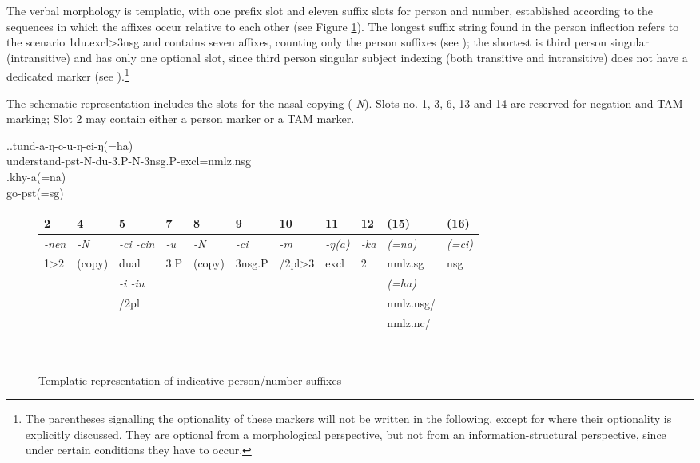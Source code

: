 The verbal morphology is  templatic, with one prefix slot and eleven suffix slots for person and number, established according to the sequences in which the affixes occur relative to each other (see Figure \ref{agr-list}). The longest suffix string found in the person inflection refers to the scenario {\sc 1du.excl>3nsg} and contains seven affixes,  counting only the person suffixes (see \Next[a]); the shortest is third person singular (intransitive) and has only one optional slot, since third person singular subject indexing (both transitive and intransitive) does not have a dedicated marker (see \Next[b]).\footnote{The parentheses signalling the optionality of these markers will not be written in the following, except for where their optionality is explicitly discussed. They are optional from a morphological perspective, but not from an information-structural perspective, since under certain conditions they have to occur.}

The schematic representation includes the slots for the nasal copying (\emph{-N}). Slots no. 1, 3, 6,  13 and 14 are reserved for negation and TAM-marking; Slot 2 may contain either a person marker or a TAM marker. 

\ex.\ag.tund-a-ŋ-c-u-ŋ-ci-ŋ(=ha)\\
understand{\sc -pst-N-du-3.P-N-3nsg.P-excl=nmlz.nsg}\\
\bg.khy-a(=na)\\
go{\sc -pst(=sg)}\\

\begin{figure}[htp]
{\small
\begin{tabular}{lllllllllll}
\toprule																																						
	2&				4&			5&						7&				8&			9&				10&				11&			12&				(15)&			(16)\\
\midrule																																						
\emph{-nen}&	\emph{-N}&	\emph{-ci \ti -cin}&\emph{-u} &\emph{-N}&	\emph{-ci}&\emph{-m}&			\emph{-ŋ(a)}&\emph{-ka}&	\emph{(=na)}&	\emph{(=ci)}\\
	1>2&			(copy)&		\sc dual&				3.P &			(copy)&		\sc 3nsg.P&		\sc 1/2pl>3&			\sc excl&	2 &		\sc nmlz.sg&		\sc nsg\\
	&				&			\emph{-i \ti -in}&		&				&			&				&				&			&				\emph{(=ha)}&	\\
	&				&			\sc 1/2pl&				&				&			&				&				&			&				\sc nmlz.nsg/&	\\    
	&				&					&				&				&			&				&				&			&				\sc nmlz.nc/&	\\    
\bottomrule																																						
\end{tabular}\\
}
\caption{Templatic representation of indicative person/number suffixes}\label{agr-list}
\end{figure} 



